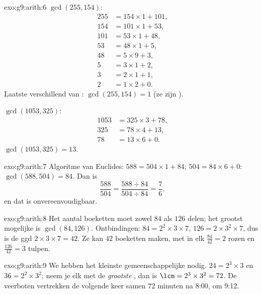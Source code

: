 \begin{solution}{exo:g9:arith:6}
$\gcd(255, 154)$:
\begin{align*}
255 &= 154 \times 1 + 101, \\
154 &= 101 \times 1 + 53, \\
101 &= 53 \times 1 + 48, \\
53 &= 48 \times 1 + 5, \\
48 &= 5 \times 9 + 3, \\
5 &= 3 \times 1 + 2, \\
3 &= 2 \times 1 + 1, \\
2 &= 1 \times 2 + 0 .
\end{align*}
Laatste  verschillend van : $\gcd(255, 154) = 1$ (ze zijn ).

$\gcd(1053, 325)$:
\begin{align*}
1053 &= 325 \times 3 + 78, \\
325 &= 78 \times 4 + 13, \\
78 &= 13 \times 6 + 0 .
\end{align*}
$\gcd(1053, 325) = 13$.
\end{solution}

\begin{solution}{exo:g9:arith:7}
Algoritme van Euclides: $588 = 504 \times 1 + 84$; $504 = 84 \times 6 + 0$:
$\gcd(588, 504) = 84$. Dan is
\[
\frac{588}{504} = \frac{588 \div 84}{504 \div 84} = \frac{7}{6},
\]
en dat is onvereenvoudigbaar.
\end{solution}

\begin{solution}{exo:g9:arith:8}
Het aantal boeketten moet zowel $84$ als $126$ delen; het grootst mogelijke is
$\gcd(84, 126)$. Ontbindingen: $84 = 2^2 \times 3 \times 7$,
$126 = 2 \times 3^2 \times 7$, dus is de ggd $2 \times 3 \times 7 = 42$. Ze kan
$42$ boeketten maken, met in elk $\frac{84}{42} = 2$ rozen en
$\frac{126}{42} = 3$ tulpen.
\end{solution}

\begin{solution}{exo:g9:arith:9}
We hebben het kleinste gemeenschappelijke  nodig. $24 = 2^3 \times 3$ en
$36 = 2^2 \times 3^2$; neem je elk  met de \emph{grootste} ,
dan is $\lcm = 2^3 \times 3^2 = 72$. De veerboten vertrekken de volgende keer
samen $72$ minuten na 8:00, om 9:12.
\end{solution}

